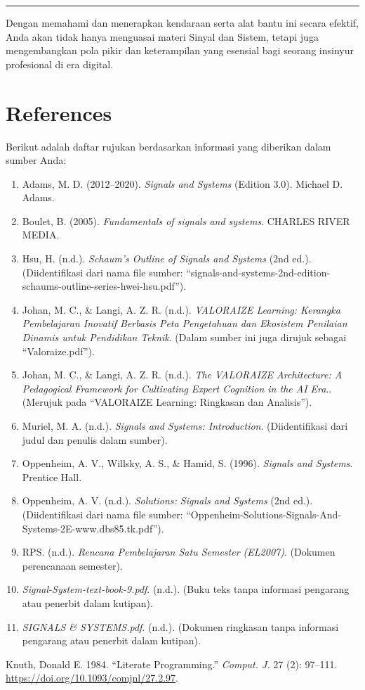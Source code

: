 \documentclass[
  letterpaper,
  DIV=11,
  numbers=noendperiod]{scrreprt}
\newlength{\cslhangindent}
\newenvironment{CSLReferences}[2] %
 {\begin{list}{}{%
  \setlength{\itemindent}{0pt}
  \setlength{\leftmargin}{0pt}
  \setlength{\parsep}{0pt}
  \ifodd #1
   \setlength{\leftmargin}{\cslhangindent}
   \setlength{\itemindent}{-1\cslhangindent}
  \fi
  \setlength{\itemsep}{#2\baselineskip}}}
 {\end{list}}
\providecommand{\tightlist}{%
  \setlength{\itemsep}{0pt}\setlength{\parskip}{0pt}}
\begin{document}
\begin{center}\rule{0.5\linewidth}{0.5pt}\end{center}

Dengan memahami dan menerapkan kendaraan serta alat bantu ini secara
efektif, Anda akan tidak hanya menguasai materi Sinyal dan Sistem,
tetapi juga mengembangkan pola pikir dan keterampilan yang esensial bagi
seorang insinyur profesional di era digital.


\chapter*{References}\label{references}


Berikut adalah daftar rujukan berdasarkan informasi yang diberikan dalam
sumber Anda:

\begin{enumerate}
\def\labelenumi{\arabic{enumi}.}
\tightlist
\item
  Adams, M. D. (2012--2020). \emph{Signals and Systems} (Edition 3.0).
  Michael D. Adams.
\item
  Boulet, B. (2005). \emph{Fundamentals of signals and systems}. CHARLES
  RIVER MEDIA.
\item
  Hsu, H. (n.d.). \emph{Schaum's Outline of Signals and Systems} (2nd
  ed.). (Diidentifikasi dari nama file sumber:
  ``signals-and-systems-2nd-edition-schaums-outline-series-hwei-hsu.pdf'').
\item
  Johan, M. C., \& Langi, A. Z. R. (n.d.). \emph{VALORAIZE Learning:
  Kerangka Pembelajaran Inovatif Berbasis Peta Pengetahuan dan Ekosistem
  Penilaian Dinamis untuk Pendidikan Teknik}. (Dalam sumber ini juga
  dirujuk sebagai ``Valoraize.pdf'').
\item
  Johan, M. C., \& Langi, A. Z. R. (n.d.). \emph{The VALORAIZE
  Architecture: A Pedagogical Framework for Cultivating Expert Cognition
  in the AI Era}.. (Merujuk pada ``VALORAIZE Learning: Ringkasan dan
  Analisis'').
\item
  Muriel, M. A. (n.d.). \emph{Signals and Systems: Introduction}.
  (Diidentifikasi dari judul dan penulis dalam sumber).
\item
  Oppenheim, A. V., Willsky, A. S., \& Hamid, S. (1996). \emph{Signals
  and Systems}. Prentice Hall.
\item
  Oppenheim, A. V. (n.d.). \emph{Solutions: Signals and Systems} (2nd
  ed.). (Diidentifikasi dari nama file sumber:
  ``Oppenheim-Solutions-Signals-And-Systems-2E-www.dbs85.tk.pdf'').
\item
  RPS. (n.d.). \emph{Rencana Pembelajaran Satu Semester (EL2007)}.
  (Dokumen perencanaan semester).
\item
  \emph{Signal-System-text-book-9.pdf}. (n.d.). (Buku teks tanpa
  informasi pengarang atau penerbit dalam kutipan).
\item
  \emph{SIGNALS \& SYSTEMS.pdf}. (n.d.). (Dokumen ringkasan tanpa
  informasi pengarang atau penerbit dalam kutipan).
\end{enumerate}

\label{refs}
\begin{CSLReferences}{1}{0}
Knuth, Donald E. 1984. {``Literate Programming.''} \emph{Comput. J.} 27
(2): 97--111. \url{https://doi.org/10.1093/comjnl/27.2.97}.

\end{CSLReferences}
\end{document}
